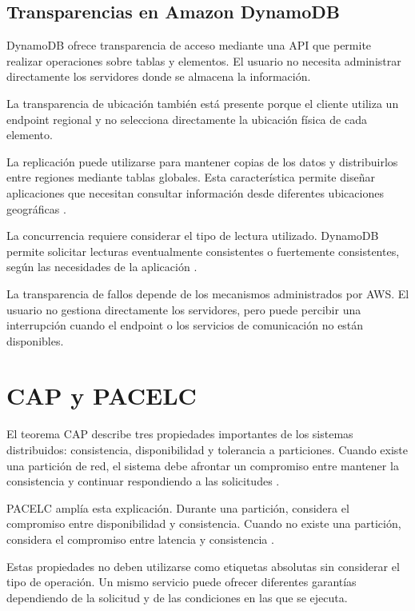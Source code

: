 \documentclass[12pt,a4paper]{article}
\begin{document}
\subsection{Transparencias en Amazon DynamoDB}

DynamoDB ofrece transparencia de acceso mediante una API que permite realizar operaciones sobre tablas y elementos. El usuario no necesita administrar directamente los servidores donde se almacena la información.

La transparencia de ubicación también está presente porque el cliente utiliza un endpoint regional y no selecciona directamente la ubicación física de cada elemento.

La replicación puede utilizarse para mantener copias de los datos y distribuirlos entre regiones mediante tablas globales. Esta característica permite diseñar aplicaciones que necesitan consultar información desde diferentes ubicaciones geográficas \cite{awsdynamodbglobaltables}.

La concurrencia requiere considerar el tipo de lectura utilizado. DynamoDB permite solicitar lecturas eventualmente consistentes o fuertemente consistentes, según las necesidades de la aplicación \cite{awsdynamodbconsistency}.

La transparencia de fallos depende de los mecanismos administrados por AWS. El usuario no gestiona directamente los servidores, pero puede percibir una interrupción cuando el endpoint o los servicios de comunicación no están disponibles.

\section{CAP y PACELC}

El teorema CAP describe tres propiedades importantes de los sistemas distribuidos: consistencia, disponibilidad y tolerancia a particiones. Cuando existe una partición de red, el sistema debe afrontar un compromiso entre mantener la consistencia y continuar respondiendo a las solicitudes \cite{brewer2012cap}.

PACELC amplía esta explicación. Durante una partición, considera el compromiso entre disponibilidad y consistencia. Cuando no existe una partición, considera el compromiso entre latencia y consistencia \cite{abadi2012pacelc}.

Estas propiedades no deben utilizarse como etiquetas absolutas sin considerar el tipo de operación. Un mismo servicio puede ofrecer diferentes garantías dependiendo de la solicitud y de las condiciones en las que se ejecuta.
\end{document}

